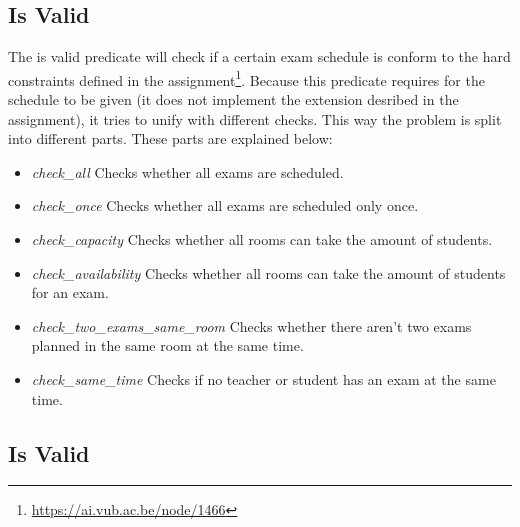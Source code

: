 \documentclass[11pt]{article}
\begin{document}
\subsection{Is Valid}
The is valid predicate will check if a certain exam schedule is conform to the hard constraints defined in the assignment\footnote{\url{https://ai.vub.ac.be/node/1466}}. Because this predicate requires for the schedule to be given (it does not implement the extension desribed in the assignment), it tries to unify with different checks. This way the problem is split into different parts. These parts are explained below:
\begin{itemize}
	\item \emph{check\_all} Checks whether all exams are scheduled.
	\item \emph{check\_once}  Checks whether all exams are scheduled only once.
	\item \emph{check\_capacity}  Checks whether all rooms can take the amount of students.
	\item \emph{check\_availability}  Checks whether all rooms can take the amount of students for an exam.
	\item \emph{check\_two\_exams\_same\_room}  Checks whether there aren't two exams planned in the same room at the same time.
	\item \emph{check\_same\_time} Checks if no teacher or student has an exam at the same time.
\end{itemize}

\subsection{Is Valid}
\end{document}
